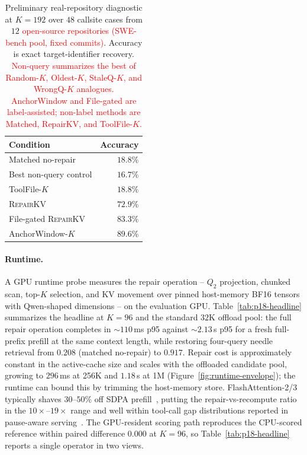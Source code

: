 \documentclass{article}
\newcommand{\repairkv}{\textsc{RepairKV}}
\begin{document}
\begin{table}[b]
  \centering
  \setlength{\tabcolsep}{5pt}
  \caption{Preliminary real-repository diagnostic at $K=192$ over $48$
  callsite cases from $12$ \textcolor{red}{open-source repositories
  (SWE-bench pool, fixed commits)}. Accuracy is
  exact target-identifier recovery. \textcolor{red}{Non-query summarizes the
  best of Random-$K$, Oldest-$K$, StaleQ-$K$, and WrongQ-$K$ analogues.} \textcolor{red}{AnchorWindow
  and File-gated are label-assisted; non-label methods are Matched,
  RepairKV, and ToolFile-$K$.}}
  \label{tab:real-repo-diagnostic}
  \begin{tabular}{@{}lr@{}}
    \toprule
    Condition & Accuracy \\
    \midrule
    Matched no-repair & $18.8\%$ \\
    Best non-query control & $16.7\%$ \\
    ToolFile-$K$ & $18.8\%$ \\
    \repairkv{} & $72.9\%$ \\
    File-gated \repairkv{} & $83.3\%$ \\
    AnchorWindow-$K$ & $89.6\%$ \\
    \bottomrule
  \end{tabular}
\end{table}

\paragraph{\textcolor{green!50!black}{Runtime.}}
\textcolor{green!50!black}{A GPU runtime probe measures the repair operation -- $Q_2$ projection, chunked scan, top-$K$ selection, and KV movement over pinned host-memory BF16 tensors with Qwen-shaped dimensions -- on the evaluation GPU. Table~\ref{tab:p18-headline} summarizes the headline at $K{=}96$ and the standard $32$K offload pool: the full repair operation completes in ${\sim}110$\,ms p95 against ${\sim}2.13$\,s p95 for a fresh full-prefix prefill at the same context length, while restoring four-query needle retrieval from $0.208$ (matched no-repair) to $0.917$. Repair cost is approximately constant in the active-cache size and scales with the offloaded candidate pool, growing to $296$\,ms at 256K and $1.18$\,s at 1M (Figure~\ref{fig:runtime-envelope}); the runtime can bound this by trimming the host-memory store. FlashAttention-2/3 typically shaves $30$--$50\%$ off SDPA prefill~\citep{flashattn2,flashattn3}, putting the repair-vs-recompute ratio in the $10\times$--$19\times$ range and well within tool-call gap distributions reported in pause-aware serving~\citep{continuum}. The GPU-resident scoring path reproduces the CPU-scored reference within paired difference $0.000$ at $K{=}96$, so Table~\ref{tab:p18-headline} reports a single operator in two views.}
\end{document}
